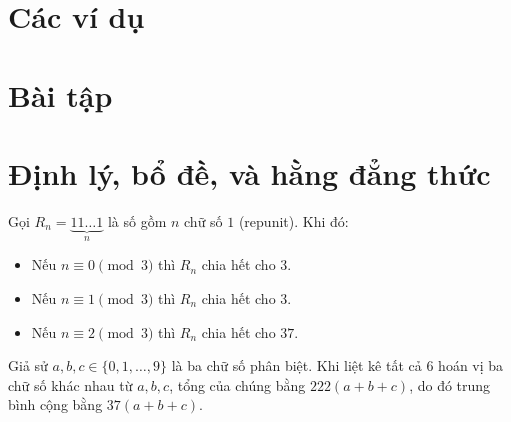 \documentclass[../imo-training-open-book.tex]{subfiles}
\begin{document}
\newpage

\section{Các ví dụ}

 \newpage
 \newpage
 \newpage
 \newpage
 \newpage
 \newpage
 \newpage
 \newpage
 \newpage
 \newpage
 \newpage
 \newpage
 \newpage
 \newpage
 \newpage

\section{Bài tập}







\newpage

\section{Định lý, bổ đề, và hằng đẳng thức}

\begin{theorem*}
	Gọi \( R_n = \underbrace{11\ldots1}_n \) là số gồm \( n \) chữ số \( 1 \) (repunit). Khi đó:
	\begin{itemize}[topsep=0pt, partopsep=0pt, itemsep=0pt]
		\item Nếu \( n \equiv 0 \pmod{3} \) thì \( R_n \) chia hết cho \( 3 \).
		\item Nếu \( n \equiv 1 \pmod{3} \) thì \( R_n \) chia hết cho \( 3 \).
		\item Nếu \( n \equiv 2 \pmod{3} \) thì \( R_n \) chia hết cho \( 37 \).
	\end{itemize}
\end{theorem*}

\begin{lemma*}\label{lemma:perm-average}
	Giả sử \( a, b, c \in \{0,1,\ldots,9\} \) là ba chữ số phân biệt. Khi liệt kê tất cả 6 hoán vị ba chữ số khác nhau từ \( a, b, c \), tổng của chúng bằng \( 222(a + b + c) \), do đó trung bình cộng bằng \( 37(a + b + c) \).
\end{lemma*}

\newpage
\end{document}
